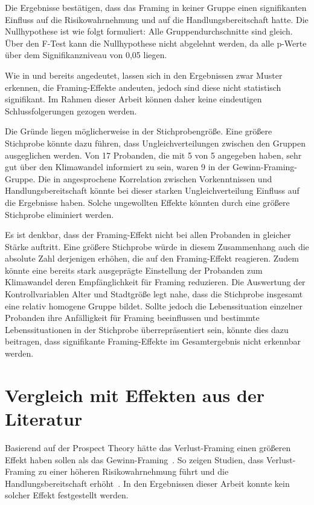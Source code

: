 \documentclass[
	12pt, %
	a4paper,
	listof=totoc, %
  bibliography=totoc, %
	numbers=noenddot, %
	german, %
	headsepline, %
	oneside %
	]{scrbook} %
\begin{document}
Die Ergebnisse bestätigen, dass das Framing in keiner Gruppe einen signifikanten Einfluss auf die Risikowahrnehmung und auf die Handlungsbereitschaft hatte. Die Nullhypothese ist wie folgt formuliert: Alle Gruppendurchschnitte sind gleich. Über den F-Test kann die Nullhypothese nicht abgelehnt werden, da alle p-Werte über dem Signifikanzniveau von 0,05 liegen.

Wie in  und  bereits angedeutet, lassen sich in den Ergebnissen zwar Muster erkennen, die Framing-Effekte andeuten, jedoch sind diese nicht statistisch signifikant. Im Rahmen dieser Arbeit können daher keine eindeutigen Schlussfolgerungen gezogen werden.

Die Gründe liegen möglicherweise in der Stichprobengröße. Eine größere Stichprobe könnte dazu führen, dass Ungleichverteilungen zwischen den Gruppen ausgeglichen werden. Von 17 Probanden, die mit 5 von 5 angegeben haben, sehr gut über den Klimawandel informiert zu sein, waren 9 in der Gewinn-Framing-Gruppe. Die in  angesprochene Korrelation zwischen Vorkenntnissen und Handlungsbereitschaft könnte bei dieser starken Ungleichverteilung Einfluss auf die Ergebnisse haben. Solche ungewollten Effekte könnten durch eine größere Stichprobe eliminiert werden.

Es ist denkbar, dass der Framing-Effekt nicht bei allen Probanden in gleicher Stärke auftritt. Eine größere Stichprobe würde in diesem Zusammenhang auch die absolute Zahl derjenigen erhöhen, die auf den Framing-Effekt reagieren. Zudem könnte eine bereits stark ausgeprägte Einstellung der Probanden zum Klimawandel deren Empfänglichkeit für Framing reduzieren. Die Auswertung der Kontrollvariablen Alter und Stadtgröße legt nahe, dass die Stichprobe insgesamt eine relativ homogene Gruppe bildet. Sollte jedoch die Lebenssituation einzelner Probanden ihre Anfälligkeit für Framing beeinflussen und bestimmte Lebenssituationen in der Stichprobe überrepräsentiert sein, könnte dies dazu beitragen, dass signifikante Framing-Effekte im Gesamtergebnis nicht erkennbar werden.

\section{Vergleich mit Effekten aus der Literatur}

Basierend auf der Prospect Theory hätte das Verlust-Framing einen größeren Effekt haben sollen als das Gewinn-Framing~\parencite{tversky1981framing}. So zeigen Studien, dass Verlust-Framing zu einer höheren Risikowahrnehmung führt und die Handlungsbereitschaft erhöht~\parencite{spence}. In den Ergebnissen dieser Arbeit konnte kein solcher Effekt festgestellt werden.
\end{document}

